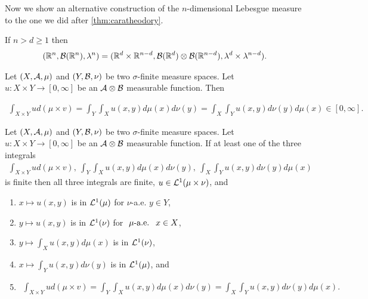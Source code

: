 Now we show an alternative construction of the $n$-dimensional Lebesgue measure to the one we did after \autoref{thm:caratheodory}.

\begin{cor}
	\label{cor:lebesgue-product-extension}
	If $n > d \geq 1$ then
	\begin{align*}
		(\mathbb{R}^n, \mathcal{B}(\mathbb{R}^n), \lambda^n)
		= (\mathbb{R}^d \times \mathbb{R}^{n-d}, \mathcal{B}(\mathbb{R}^d) \otimes \mathcal{B}(\mathbb{R}^{n-d}), \lambda^d \times \lambda^{n-d}).
	\end{align*}
\end{cor}

\begin{thm}[Tonelli]
	Let $(X, \mathcal{A}, \mu)$ and $(Y, \mathcal{B}, \nu)$ be two $\sigma$-finite measure spaces. Let $u : X \times Y \to [0,\infty]$ be an $\mathcal{A} \otimes \mathcal{B}$ measurable function. Then
	
	\begin{align}
		\int_{X\times Y} u d(\mu \times v)
		= \int_Y \int_X u(x, y) d\mu(x) d\nu(y)
		= \int_X \int_Y u(x, y) d\nu(y) d\mu(x)
		\in [0, \infty].
	\end{align}
\end{thm}

\begin{thm}[Fubini]
	Let $(X, \mathcal{A}, \mu)$ and $(Y, \mathcal{B}, \nu)$ be two $\sigma$-finite measure spaces. Let $u : X \times Y \to [0,\infty]$ be an $\mathcal{A} \otimes \mathcal{B}$ measurable function. If at least one of the three integrals
	\begin{align*}
		\int_{X\times Y} u d(\mu \times v)
		,\ \int_Y \int_X u(x, y) d\mu(x) d\nu(y)
		,\ \int_X \int_Y u(x, y) d\nu(y) d\mu(x)
	\end{align*}
	is finite then all three integrals are finite, $u \in \mathcal{L}^1(\mu \times \nu)$, and
	\begin{enumerate}
		\item $x \mapsto u(x, y)$ is in $\mathcal{L}^1(\mu)$ for $\nu$-a.e. $y \in Y$,
		\item $y \mapsto u(x, y)$ is in $\mathcal{L}^1(\nu)$ for $\ \mu\text{-a.e. }\ x \in X$,
		\item $y \mapsto \int_X u(x, y)d\mu(x)$ is in $\mathcal{L}^1(\nu)$,
		\item $x \mapsto \int_Y u(x, y)d\nu(y)$ is in $\mathcal{L}^1(\mu)$, and
		\item
		\begin{align*}
			\int_{X\times Y} u d(\mu \times v)
			= \int_Y \int_X u(x, y) d\mu(x) d\nu(y)
			= \int_X \int_Y u(x, y) d\nu(y) d\mu(x).
		\end{align*}
	\end{enumerate}
\end{thm}

